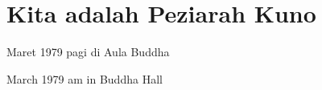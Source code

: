 \chapter{Kita adalah Peziarah Kuno} %

 Maret 1979 pagi di Aula Buddha

 March 1979 am in Buddha Hall

